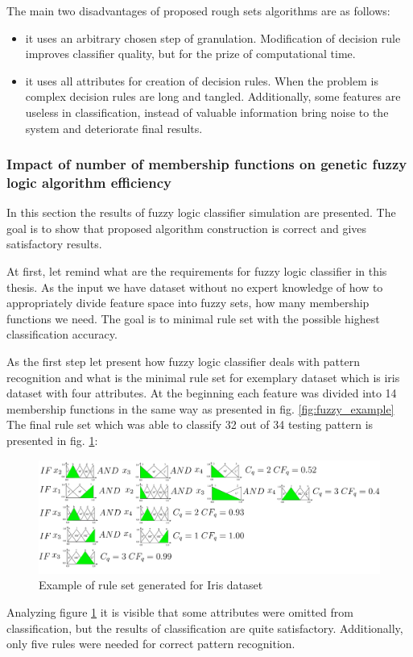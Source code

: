 The main two disadvantages of proposed rough sets algorithms are as follows:
\begin{itemize}
    \item it uses an arbitrary chosen step of granulation. Modification of
        decision rule improves classifier quality, but for the prize of
        computational time. 
    \item it uses all attributes for creation of decision rules. When the
        problem is complex decision rules are long and tangled. Additionally,
        some features are useless in classification, instead of valuable
        information bring noise to the system and deteriorate final results.
\end{itemize}

\subsubsection{Impact of number of membership functions on genetic fuzzy logic algorithm efficiency}
\label{cha:Simulation_reaearch_3}
In this section the results of fuzzy logic classifier simulation are presented.
The goal is to show that proposed algorithm construction is correct and gives
satisfactory results. 

At first, let remind what are the requirements for fuzzy logic classifier in
this thesis. As the input we have dataset without no expert knowledge of how to
appropriately divide feature space into fuzzy sets, how many membership
functions we need. The goal is to minimal rule set with the possible highest
classification accuracy. 

As the first step let present how fuzzy logic classifier deals with pattern
recognition and what is the minimal rule set for exemplary dataset which is
iris dataset with four attributes. At the beginning each feature was divided
into 14 membership functions in the same way as presented in fig. \ref{fig:fuzzy_example}
The final rule set which was able to classify 32 out of 34 testing pattern is
presented in fig. \ref{fig:fuzzy_result}:
\begin{figure}[H]
    \begin{center}
        \includegraphics[width=\textwidth]{fig/fuzzy_result.png}
    \end{center}
    \caption{Example of rule set generated for Iris dataset}
    \label{fig:fuzzy_result}
\end{figure}
Analyzing figure \ref{fig:fuzzy_result} it is visible that some attributes were
omitted from classification, but the results of classification are quite
satisfactory. Additionally, only five rules were needed for correct pattern
recognition.

